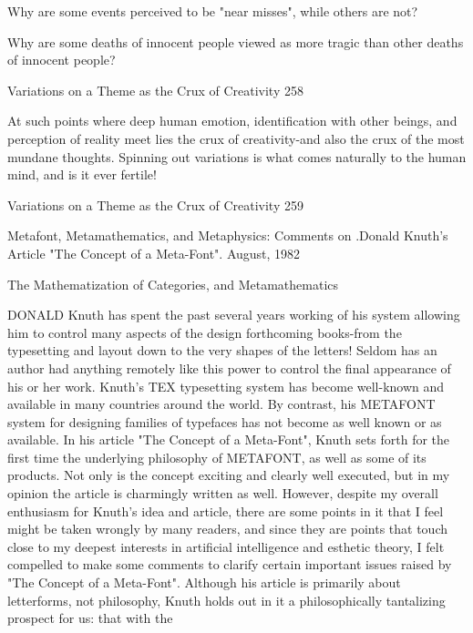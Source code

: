        Why are some events perceived to be "near misses", while others are not?

       Why are some deaths of innocent people viewed as more tragic than other
       deaths of innocent people?




Variations on a Theme as the Crux of Creativity                                     258

At such points where deep human emotion, identification with other beings, and
perception of reality meet lies the crux of creativity-and also the crux of the most
mundane thoughts. Spinning out variations is what comes naturally to the human
mind, and is it ever fertile!




Variations on a Theme as the Crux of Creativity                                 259


                    Metafont, Metamathematics,
                   and Metaphysics: Comments on
                      .Donald Knuth's Article
                   "The Concept of a Meta-Font".
                                       August, 1982


        The Mathematization of Categories, and Metamathematics

DONALD Knuth has spent the past several years working of his system allowing him
to control many aspects of the design forthcoming books-from the typesetting and layout
down to the very shapes of the letters! Seldom has an author had anything remotely like
this power to control the final appearance of his or her work. Knuth's TEX typesetting
system has become well-known and available in many countries around the world. By
contrast, his METAFONT system for designing families of typefaces has not become as
well known or as available.
         In his article "The Concept of a Meta-Font", Knuth sets forth for the first time the
underlying philosophy of METAFONT, as well as some of its products. Not only is the
concept exciting and clearly well executed, but in my opinion the article is charmingly
written as well. However, despite my overall enthusiasm for Knuth's idea and article,
there are some points in it that I feel might be taken wrongly by many readers, and since
they are points that touch close to my deepest interests in artificial intelligence and
esthetic theory, I felt compelled to make some comments to clarify certain important
issues raised by "The Concept of a Meta-Font".
         Although his article is primarily about letterforms, not philosophy, Knuth holds
out in it a philosophically tantalizing prospect for us: that with the




